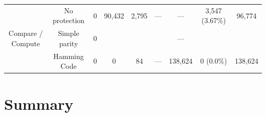 \begin{table}[t]
\begin{tabular}{@{}ccccccccc@{}}
        \multirow{3}{*}{Compare / Compute} & No protection & 0     & 90,432  & 2,795  & —         & —                                                                 & 3,547 (3.67\%)  & 96,774  \\
                                           & Simple parity & 0     &         &        &           & —                                                                 &                 &         \\
                                           & Hamming Code  & 0     & 0       & 84     & —         & 138,624                                                           & 0 (0.0\%)       & 138,624 \\
        \bottomrule
    \end{tabular}
\end{table}

\section{Summary}

